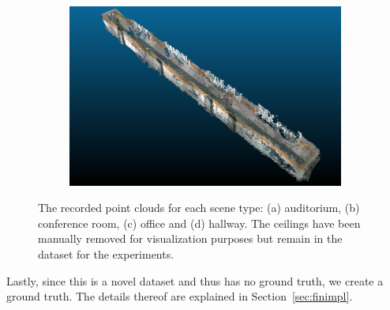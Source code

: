 \documentclass[main.tex]{subfiles}
\begin{document}
\begin{figure}[H]
\begin{subfigure}{0.5\textwidth}
        \caption[Dynamic Dataset office]{}
        \label{fig:fin425}
    \end{subfigure}
    \begin{subfigure}{0.5\textwidth}
        \centering
        \includegraphics[width=0.9\linewidth]{images/hallway.png}
        \caption[Dynamic Dataset office]{}
        \label{fig:finhw}
    \end{subfigure}
    \caption[Dynamic Datasets]{The recorded point clouds for each scene type: (a) auditorium, (b) conference room, (c) office and (d) hallway. 
    The ceilings have been manually removed for visualization purposes but remain in the dataset for the experiments.}
    \label{fig:fin}
\end{figure}
Lastly, since this is a novel dataset and thus has no ground truth, we create a ground truth. The details thereof are explained in Section~\ref{sec:finimpl}.


\end{document}
